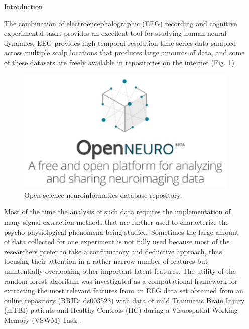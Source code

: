 \documentclass[final]{beamer}
\newlength{\sepwidth}
\newlength{\colwidth}
\newcommand{\separatorcolumn}{\begin{column}{\sepwidth}\end{column}}
\begin{document}
\begin{frame}[t]
\begin{columns}[t]
\separatorcolumn

\begin{column}{\colwidth}

  \begin{block}{Introduction}

    The combination of electroencephalographic (EEG) recording and cognitive experimental tasks provides an excellent tool for studying human neural dynamics. EEG provides high temporal resolution time series data sampled across multiple scalp locations that produces large amounts of data, and some of these datasets are freely available in repositories on the internet (Fig. 1). 

    \begin{figure}
      \centering
      \includegraphics[width=25cm]{img/bids2.png} 
      \caption{Open-science neuroinformatics database repository.}
    \end{figure}

    Most of the time the analysis of such data requires the implementation of many signal extraction methods that are further used to characterize the psycho physiological phenomena being studied. Sometimes the large amount of data collected for one experiment is not fully used because most of the researchers prefer to take a confirmatory and deductive approach, thus focusing their attention in a rather narrow number of features but unintentially overlooking other important latent  features.
    The utility of the random forest algorithm was investigated as a computational framework for extracting the most relevant features from an EEG data set obtained from an online repository (RRID: ds003523) with data of mild Traumatic Brain Injury (mTBI) patients and Healthy Controls (HC) during a Visuospatial Working Memory (VSWM) Task . 


\end{block}
\end{column}
\end{columns}
\end{frame}
\end{document}

